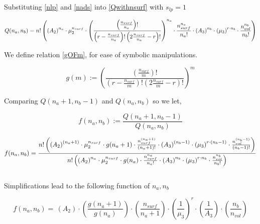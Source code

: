\documentclass[10pt,letterpaper]{article}
\newcommand{\nads}[1]{
    \ensuremath{
        \frac{
            n_{surf}
        }{
            #1
        }
    }
}
\newcommand{\nlp}[1]{
    \ensuremath{
        r
        -
        \nads{#1}
    }
}
\newcommand{\myQ}[5]{
	\ensuremath{	
		n!
		\left(
		\left(
		A_2
		\right)^{#1}
		\cdot 
		\mu_{2}^{n_{surf}} 
		\cdot 
		#5
		\cdot
		\frac{
		        n_{surf}^{#1}
		    }{
		        #1!
		    }
		\cdot
		\left(
		    A_3
		\right)^{#2}
		\cdot 
		\left(
		    \mu_{3}
		\right)^{r\cdotp #2}
		\cdot
		\frac{
			n_{vol}^{#2}
		}{
			#2!
		}
		\right)
		}
}
\newcommand{\gOFm}[2]{
\left( \frac{
\left(\frac{#2}{#1}\right)!}{ 
\left(r-\frac{#2}{#1}\right)! 
\left(2\frac{#2}{#1}-r\right)!}
\right)^{#1}  
}
\begin{document}
\noindent Substituting \ref{nlp} and \ref{nads} into \ref{Qwithnsurf}
%
%
with $s_{lp}=1$

\begin{equation}
	Q(n_a,n_b)=\myQ{n_a}{n_b}{\nads{n_a}}{(\nlp{n_a})}{\gOFm{n_a}{n_{surf}}}
	\label{eq. Qab}
\end{equation}

\noindent We define relation \ref{gOFm}, for ease of symbolic manipulations.

\begin{equation}
    \boxed{g(m):= \gOFm{m}{n_{surf}}}
    \label{gOFm}
\end{equation}


\noindent Comparing $Q(n_a+1,n_b-1)$ and $Q(n_a,n_b)$ so we let,

\begin{equation}
    \boxed{f(n_a,n_b):=\frac{Q(n_a+1,n_b-1)}{Q(n_a,n_b)}}
    \label{QfracDEF}
\end{equation}


\begin{equation}
f(n_a,n_b)=
	\frac{
		\myQ{(n_a+1)}{(n_b-1)}{\nads{n_a+1}}{(\nlp{n_a+1})}{g(n_a+1)}
	}{
		\myQ{n_a}{n_b}{\nads{n_a}}{(\nlp{n_a})}{g(n_a)}
	}
	\label{eq. Qratio2}
\end{equation}
\text{}\\

\noindent Simplifications lead to the following function of $n_a,n_b$


\begin{equation}
f(n_a,n_b)=\,
\left(
    A_2
\right)
\cdotp
\left(
	\frac{
		g(n_a+1)
	}{
		g(n_a)
	}
\right)
\cdotp
\left(
    \frac{
    	n_{surf}
    }{
    	n_a+1
    }
\right)
\cdotp
\left(
    \frac{
    	1
    }{
    	\mu_{3}
    }
    \right)^r
\cdot
\left(
    \frac{
        1
    }{
        A_3
    }
\right)
\cdot
\left(
    \frac{
    	n_{b}
    }{
    	n_{vol}	
    } 
\right)
\label{fnanb}
\end{equation}



\end{document}

